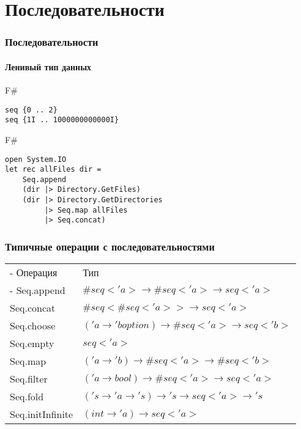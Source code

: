 \documentclass[xetex,mathserif,serif]{beamer}
\begin{document}
	\section{Последовательности}
	
	\begin{frame}[fragile]
		\frametitle{Последовательности}
		\framesubtitle{Ленивый тип данных}
		\begin{exampleblock}{F\#}
			\begin{lstlisting}
seq {0 .. 2}
seq {1I .. 1000000000000I}
\end{lstlisting}
\end{exampleblock}

		\begin{exampleblock}{F\#}
			\begin{lstlisting}
open System.IO
let rec allFiles dir =
    Seq.append
    (dir |> Directory.GetFiles)
    (dir |> Directory.GetDirectories 
         |> Seq.map allFiles 
         |> Seq.concat)
\end{lstlisting}
\end{exampleblock}
\end{frame}

	\begin{frame}
		\frametitle{Типичные операции с последовательностями}
		\begin{small}
			\begin{tabu} {| X[0.5 l p] | X[1 l p] |}
				\tabucline-
				Операция                               & Тип                    \\
				\tabucline-
				\everyrow{\tabucline-}
				Seq.append                    & $\#seq<'a> \to \#seq<'a> \to seq<'a>$ \\
				Seq.concat                    & $\#seq<\#seq<'a>> \to seq<'a>$ \\
				Seq.choose                    & $('a \to 'b option) \to \#seq<'a> \to seq<'b>$ \\
				Seq.empty                     & $seq<'a>$ \\
				Seq.map                       & $('a \to 'b) \to \#seq<'a> \to \#seq<'b>$ \\
				Seq.filter                    & $('a \to bool) \to \#seq<'a> \to seq<'a>$ \\
				Seq.fold                      & $('s \to 'a \to 's) \to 's \to seq<'a> \to 's$ \\
				Seq.initInfinite          & $(int \to 'a) \to seq<'a>$ \\
\end{tabu}
\end{small}
\end{frame}
\end{document}
